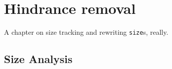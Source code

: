 \chapter{Hindrance removal}
\label{chap:hindrance-removal}

A chapter on size tracking and rewriting \texttt{size}s, really.

\section{Size Analysis}
\label{sec:size-analysis}

